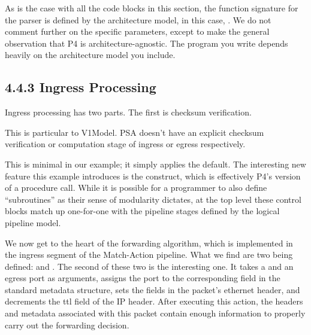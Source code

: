 \documentclass[letterpaper,11pt,english]{sphinxmanual}
\begin{document}
As is the case with all the code blocks in this section, the function
signature for the parser is defined by the architecture model, in this
case, . We do not comment further on the specific
parameters, except to make the general observation that P4 is
architecture-agnostic. The program you write depends heavily on the
architecture model you include.


\subsection{4.4.3 Ingress Processing}
\label{\detokenize{switch:ingress-processing}}
Ingress processing has two parts. The first is checksum verification.%
\begin{footnote}[4]\sphinxAtStartFootnote
This is particular to V1Model. PSA doesn’t have an explicit
checksum verification or computation stage of ingress or egress
respectively.
%
\end{footnote} This is minimal in our example; it simply applies the
default. The interesting new feature this example introduces is the
 construct, which is effectively P4’s version of a
procedure call. While it is possible for a programmer to also define
“subroutines” as their sense of modularity dictates, at the top level
these control blocks match up one-for-one with the pipeline stages
defined by the logical pipeline model.

\begin{sphinxVerbatim}[commandchars=\\\{\}]

       
       
\end{sphinxVerbatim}

We now get to the heart of the forwarding algorithm, which is
implemented in the ingress segment of the Match-Action pipeline. What
we find are two  being defined:  and
. The second of these two is the interesting one. It
takes a  and an egress port as arguments, assigns the port
to the corresponding field in the standard metadata structure, sets
the  fields in the packet’s ethernet header, and
decrements the ttl field of the IP header. After executing this
action, the headers and metadata associated with this packet contain
enough information to properly carry out the forwarding decision.
\end{document}
